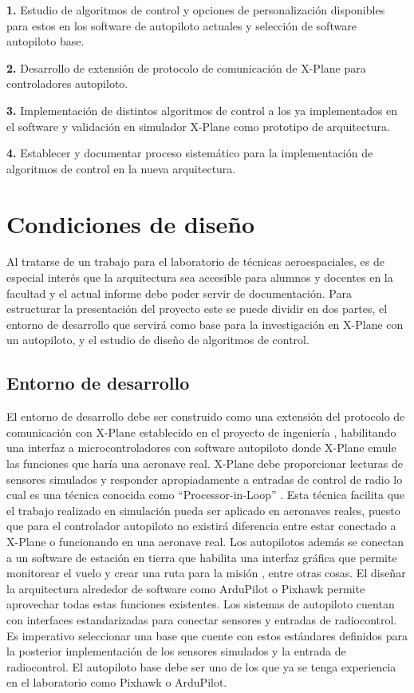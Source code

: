 \textbf{1.} Estudio de algoritmos de control y opciones de personalización disponibles para estos en los software de autopiloto actuales y selección de software autopiloto base.

\textbf{2.} Desarrollo de extensión de protocolo de comunicación de X-Plane para controladores autopiloto.

\textbf{3.} Implementación de distintos algoritmos de control a los ya implementados en el software y validación en simulador X-Plane como prototipo de arquitectura.

\textbf{4.} Establecer y documentar proceso sistemático para la implementación de algoritmos de control en la nueva arquitectura.

\section{Condiciones de diseño}

Al tratarse de un trabajo para el laboratorio de técnicas aeroespaciales, es de especial interés que la arquitectura sea accesible para alumnos y docentes en la facultad y el actual informe debe poder servir de documentación. Para estructurar la presentación del proyecto este se puede dividir en dos partes, el entorno de desarrollo que servirá como base para la investigación en X-Plane con un autopiloto, y el estudio de diseño de algoritmos de control.

\subsection{Entorno de desarrollo}

El entorno de desarrollo debe ser construido como una extensión del protocolo de comunicación con X-Plane establecido en el proyecto de ingeniería \cite{pia}, habilitando una interfaz a microcontroladores con software autopiloto donde X-Plane emule las funciones que haría una aeronave real. X-Plane debe proporcionar lecturas de sensores simulados y responder apropiadamente a entradas de control de radio lo cual es una técnica conocida como ``Processor-in-Loop'' \cite{pil}. Esta técnica facilita que el trabajo realizado en simulación pueda ser aplicado en aeronaves reales, puesto que para el controlador autopiloto no existirá diferencia entre estar conectado a X-Plane o funcionando en una aeronave real. Los autopilotos además se conectan a un software de estación en tierra que habilita una interfaz gráfica que permite monitorear el vuelo y crear una ruta para la misión \cite{ardupilot-gs}, entre otras cosas. El diseñar la arquitectura alrededor de software como ArduPilot o Pixhawk permite aprovechar todas estas funciones existentes. Los sistemas de autopiloto cuentan con interfaces estandarizadas para conectar sensores y entradas de radiocontrol. Es imperativo seleccionar una base que cuente con estos estándares definidos para la posterior implementación de los sensores simulados y la entrada de radiocontrol. El autopiloto base debe ser uno de los que ya se tenga experiencia en el laboratorio como Pixhawk o ArduPilot.


